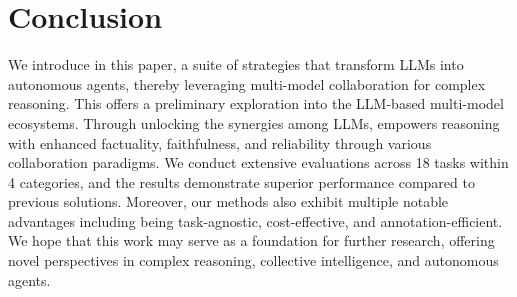 \section{Conclusion}

We introduce \ours in this paper,
a suite of strategies that transform LLMs into autonomous agents, 
thereby leveraging multi-model collaboration for complex reasoning. 
This offers a preliminary exploration into the LLM-based multi-model ecosystems.
Through unlocking the synergies among LLMs,
\ours empowers reasoning with enhanced factuality, 
faithfulness, 
and reliability through various collaboration paradigms.
We conduct extensive evaluations across 18 tasks within 4 categories, 
and the results demonstrate superior performance compared to previous solutions.
Moreover,
our methods also exhibit multiple notable advantages including being task-agnostic,
cost-effective,
and annotation-efficient.
We hope that this work may serve as a foundation for further research, 
offering novel perspectives in complex reasoning, 
collective intelligence, 
and autonomous agents.